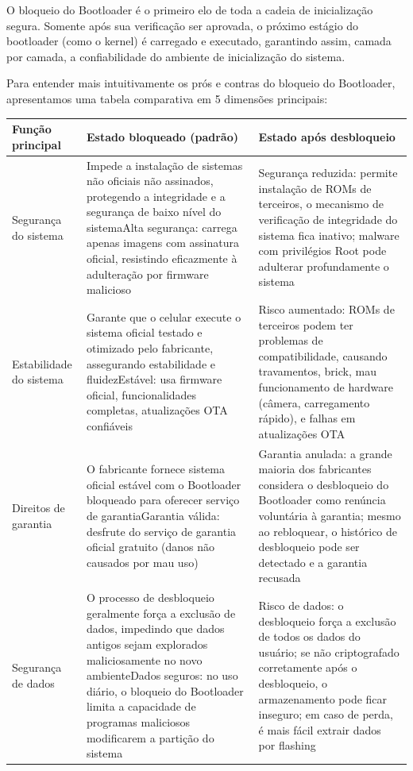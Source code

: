 
O bloqueio do Bootloader é o primeiro elo de toda a cadeia de inicialização segura. Somente após sua verificação ser aprovada, o próximo estágio do bootloader (como o kernel) é carregado e executado, garantindo assim, camada por camada, a confiabilidade do ambiente de inicialização do sistema.


Para entender mais intuitivamente os prós e contras do bloqueio do Bootloader, apresentamos uma tabela comparativa em 5 dimensões principais:

\begin{center}
\begin{tabularx}{\linewidth}{|X|X|X|}
\hline
\textbf{Função principal} & \textbf{Estado bloqueado (padrão)} & \textbf{Estado após desbloqueio} \tabularnewline
\hline
Segurança do sistema & Impede a instalação de sistemas não oficiais não assinados, protegendo a integridade e a segurança de baixo nível do sistema\newline Alta segurança: carrega apenas imagens com assinatura oficial, resistindo eficazmente à adulteração por firmware malicioso & Segurança reduzida: permite instalação de ROMs de terceiros, o mecanismo de verificação de integridade do sistema fica inativo; malware com privilégios Root pode adulterar profundamente o sistema \tabularnewline
Estabilidade do sistema & Garante que o celular execute o sistema oficial testado e otimizado pelo fabricante, assegurando estabilidade e fluidez\newline Estável: usa firmware oficial, funcionalidades completas, atualizações OTA confiáveis & Risco aumentado: ROMs de terceiros podem ter problemas de compatibilidade, causando travamentos, brick, mau funcionamento de hardware (câmera, carregamento rápido), e falhas em atualizações OTA \tabularnewline
Direitos de garantia & O fabricante fornece sistema oficial estável com o Bootloader bloqueado para oferecer serviço de garantia\newline Garantia válida: desfrute do serviço de garantia oficial gratuito (danos não causados por mau uso) & Garantia anulada: a grande maioria dos fabricantes considera o desbloqueio do Bootloader como renúncia voluntária à garantia; mesmo ao rebloquear, o histórico de desbloqueio pode ser detectado e a garantia recusada \tabularnewline
Segurança de dados & O processo de desbloqueio geralmente força a exclusão de dados, impedindo que dados antigos sejam explorados maliciosamente no novo ambiente\newline Dados seguros: no uso diário, o bloqueio do Bootloader limita a capacidade de programas maliciosos modificarem a partição do sistema & Risco de dados: o desbloqueio força a exclusão de todos os dados do usuário; se não criptografado corretamente após o desbloqueio, o armazenamento pode ficar inseguro; em caso de perda, é mais fácil extrair dados por flashing \tabularnewline

\end{tabularx}
\end{center}
